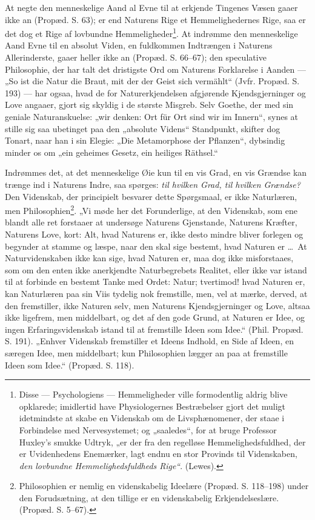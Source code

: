 \documentclass[12pt,a4paper]{book}
\begin{document}
At negte den menneskelige Aand al Evne til at erkjende Tingenes Væsen
gaaer ikke an (Propæd. S. 63); er end Naturens Rige et Hemmelighedernes
Rige, saa er det dog et Rige af lovbundne Hemmeligheder\footnote{Disse
--- Psychologiens --- Hemmeligheder ville formodentlig aldrig blive
opklarede; imidlertid have Physiologernes Bestræbelser gjort det muligt
idetmindste at skabe en Videnskab om de Livsphænomener, der staae i
Forbindelse med Nervesystemet; og „saaledes“, for at bruge Professor
Huxley's smukke Udtryk, „er der fra den regelløse Hemmelighedsfuldhed,
der er Uvidenhedens Enemærker, lagt endnu en stor Provinds til
Videnskaben, \emph{den lovbundne Hemmelighedsfuldheds Rige“}.
(Lewes).}. At indrømme den menneskelige Aand Evne til en absolut Viden,
en fuldkommen Indtrængen i Naturens Allerinderste, gaaer heller ikke an
(Propæd. S. 66--67); den speculative Philosophie, der har talt det
dristigste Ord om Naturens Forklarelse i Aanden --- „So ist die Natur die
Braut, mit der der Geist sich vermählt“ (Jvfr. Propæd. S. 193) --- har
ogsaa, hvad de for Naturerkjendelsen afgjørende Kjendsgjerninger og Love
angaaer, gjort sig skyldig i de største Misgreb. Selv Goethe, der med sin
geniale Naturanskuelse: „wir denken: Ort für Ort sind wir im Innern“,
synes at stille sig saa ubetinget paa den „absolute Videns“ Standpunkt,
skifter dog Tonart, naar han i sin Elegie: „Die Metamorphose der
Pflanzen“, dybsindig minder os om „ein geheimes Gesetz, ein heiliges
Räthsel.“

Indrømmes det, at det menneskelige Øie kun til en vis Grad, en vis
Grændse kan trænge ind i Naturens Indre, saa spørges: \emph{til hvilken
Grad, til hvilken Grændse?} Den Videnskab, der principielt besvarer
dette Spørgsmaal, er
\setcounter{footnote}{0}
ikke Naturlæren, men Philosophien\footnote{Philosophien er nemlig en
videnskabelig Ideelære (Propæd. S. 118--198) under den Forudsætning, at
den tillige er en videnskabelig Erkjendelseslære. (Propæd. S.
5--67).}. „Vi møde her det Forunderlige, at den Videnskab, som ene
blandt alle ret forstaaer at undersøge Naturens Gjenstande, Naturens
Kræfter, Naturens Love, kort: Alt, hvad Naturens er, ikke desto mindre
bliver forlegen og begynder at stamme og læspe, naar den skal sige
bestemt, hvad Naturen er \dots\ At Naturvidenskaben ikke kan sige, hvad
Naturen er, maa dog ikke misforstaaes, som om den enten ikke anerkjendte
Naturbegrebets Realitet, eller ikke var istand til at forbinde en
bestemt Tanke med Ordet: Natur; tvertimod! hvad Naturen er, kan
Naturlæren paa sin Viis tydelig nok fremstille, men, vel at mærke,
derved, at den fremstiller, ikke Naturen selv, men Naturens
Kjendsgjerninger og Love, altsaa ikke ligefrem, men middelbart, og det
af den gode Grund, at Naturen er Idee, og ingen Erfaringsvidenskab
istand til at fremstille Ideen som Idee.“ (Phil. Propæd. S. 191).
„Enhver Videnskab fremstiller et Ideens Indhold, en Side af Ideen, en
særegen Idee, men middelbart; kun Philosophien lægger an paa at
fremstille Ideen som Idee.“ (Propæd. S. 118).
\end{document}
